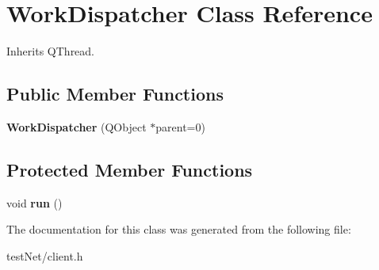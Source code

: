 \hypertarget{class_work_dispatcher}{\section{Work\-Dispatcher Class Reference}
\label{class_work_dispatcher}
}


Inherits Q\-Thread.

\subsection*{Public Member Functions}
\begin{DoxyCompactItemize}
\item 
\hypertarget{class_work_dispatcher_a0492b5fce81f9ab824fe5da342e46a45}{{\bfseries Work\-Dispatcher} (Q\-Object $\ast$parent=0)}\label{class_work_dispatcher_a0492b5fce81f9ab824fe5da342e46a45}

\end{DoxyCompactItemize}
\subsection*{Protected Member Functions}
\begin{DoxyCompactItemize}
\item 
\hypertarget{class_work_dispatcher_a72eb6fdeb7acfd602977b63a72f376be}{void {\bfseries run} ()}\label{class_work_dispatcher_a72eb6fdeb7acfd602977b63a72f376be}

\end{DoxyCompactItemize}


The documentation for this class was generated from the following file\-:\begin{DoxyCompactItemize}
\item 
test\-Net/client.\-h\end{DoxyCompactItemize}
